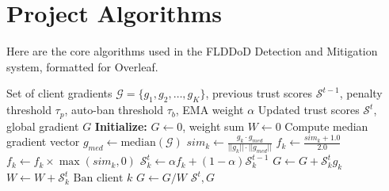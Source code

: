 \documentclass{article}
\begin{document}
\section*{Project Algorithms}
Here are the core algorithms used in the FLDDoD Detection and Mitigation system, formatted for Overleaf.

\begin{algorithm}[H]
\caption{Adaptive Trust-based Federated Aggregation}
\begin{algorithmic}[1]
\REQUIRE Set of client gradients $\mathcal{G} = \{g_1, g_2, \dots, g_K\}$, previous trust scores $\mathcal{S}^{t-1}$, penalty threshold $\tau_p$, auto-ban threshold $\tau_b$, EMA weight $\alpha$
\ENSURE Updated trust scores $\mathcal{S}^t$, global gradient $G$
\STATE \textbf{Initialize:} $G \leftarrow 0$, weight sum $W \leftarrow 0$
\STATE Compute median gradient vector $g_{med} \leftarrow \text{median}(\mathcal{G})$ 
    \STATE $sim_k \leftarrow \frac{g_k \cdot g_{med}}{||g_k|| \cdot ||g_{med}||}$ 
    \STATE $f_k \leftarrow \frac{sim_k + 1.0}{2.0}$ 
        \STATE $f_k \leftarrow f_k \times \max(sim_k, 0)$ 
    \ENDIF
    \STATE $\mathcal{S}^t_k \leftarrow \alpha f_k + (1 - \alpha) \mathcal{S}^{t-1}_k$ 
        \STATE $G \leftarrow G + \mathcal{S}^t_k g_k$ 
        \STATE $W \leftarrow W + \mathcal{S}^t_k$
    \ELSE
        \STATE $\text{Ban client } k$ 
    \ENDIF
\ENDFOR
{}
    \STATE $G \leftarrow G / W$ 
\ENDIF
\RETURN $\mathcal{S}^t, G$
\end{algorithmic}
\end{algorithm}
\end{document}
